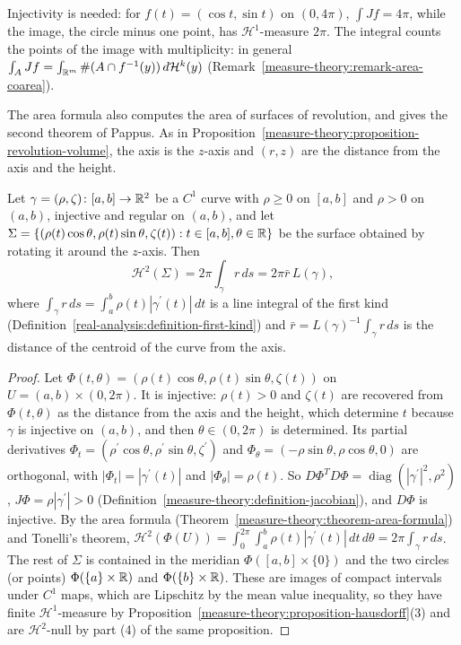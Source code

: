 \begin{counterexample}\label{measure-theory:counterexample-area-injective}
Injectivity is needed: for $f(t) = (\cos t, \sin t)$ on $(0, 4\pi)$, $\int Jf = 4\pi$, while the image, the circle minus one point, has $\mathcal{H}^1$-measure $2\pi$. The integral counts the points of the
image with multiplicity: in general $\int_AJf = \int_{\mathbb{R}^m}\#(A \cap f^{-1}(y))\,d\mathcal{H}^k(y)$ (Remark~\ref{measure-theory:remark-area-coarea}).
\end{counterexample}

The area formula also computes the area of surfaces of revolution, and gives the second theorem of Pappus. As in Proposition~\ref{measure-theory:proposition-revolution-volume}, the axis is the $z$-axis and
$(r, z)$ are the distance from the axis and the height.

\begin{proposition}\label{measure-theory:proposition-pappus-area}
Let $\gamma = (\rho, \zeta) \colon [a, b] \to \mathbb{R}^2$ be a $C^1$ curve with $\rho \geq 0$ on $[a, b]$ and $\rho > 0$ on $(a, b)$, injective and regular on $(a, b)$, and let
$\Sigma = \{(\rho(t)\cos\theta, \rho(t)\sin\theta, \zeta(t)) : t \in [a, b], \theta \in \mathbb{R}\}$ be the surface obtained by rotating it around the $z$-axis. Then
\[
\mathcal{H}^2(\Sigma) = 2\pi\int_\gamma r\,ds = 2\pi\bar r\,L(\gamma),
\]
where $\int_\gamma r\,ds = \int_a^b\rho(t)|\gamma^{\prime}(t)|\,dt$ is a line integral of the first kind (Definition~\ref{real-analysis:definition-first-kind}) and $\bar r = L(\gamma)^{-1}\int_\gamma r\,ds$ is the distance of the
centroid of the curve from the axis.
\end{proposition}

\begin{proof}
Let $\Phi(t, \theta) = (\rho(t)\cos\theta, \rho(t)\sin\theta, \zeta(t))$ on $U = (a, b) \times (0, 2\pi)$. It is injective: $\rho(t) > 0$ and $\zeta(t)$ are recovered from $\Phi(t, \theta)$ as the distance from the axis and
the height, which determine $t$ because $\gamma$ is injective on $(a, b)$, and then $\theta \in (0, 2\pi)$ is determined. Its partial derivatives
$\Phi_t = (\rho^{\prime}\cos\theta, \rho^{\prime}\sin\theta, \zeta^{\prime})$ and $\Phi_\theta = (-\rho\sin\theta, \rho\cos\theta, 0)$ are orthogonal, with $|\Phi_t| = |\gamma^{\prime}(t)|$ and $|\Phi_\theta| = \rho(t)$. So
$D\Phi^TD\Phi = \operatorname{diag}(|\gamma^{\prime}|^2, \rho^2)$, $J\Phi = \rho|\gamma^{\prime}| > 0$ (Definition~\ref{measure-theory:definition-jacobian}), and $D\Phi$ is injective. By the area formula
(Theorem~\ref{measure-theory:theorem-area-formula}) and Tonelli's theorem, $\mathcal{H}^2(\Phi(U)) = \int_0^{2\pi}\int_a^b\rho(t)|\gamma^{\prime}(t)|\,dt\,d\theta = 2\pi\int_\gamma r\,ds$. The rest of $\Sigma$ is contained in the
meridian $\Phi([a, b] \times \{0\})$ and the two circles (or points) $\Phi(\{a\} \times \mathbb{R})$ and $\Phi(\{b\} \times \mathbb{R})$. These are images of compact intervals under $C^1$ maps, which are Lipschitz by the mean value
inequality, so they have finite $\mathcal{H}^1$-measure by Proposition~\ref{measure-theory:proposition-hausdorff}(3) and are $\mathcal{H}^2$-null by part (4) of the same proposition.
\end{proof}

